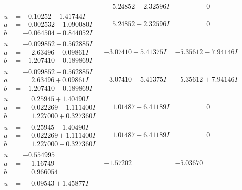 \documentclass[1p]{elsarticle_modified}
\theoremstyle{definition}
\begin{document}
$$\begin{array}{c|c|c}
 & \phantom{-}5.24852 + 2.32596 I & \phantom{-0.000000 } 0 \\ \hline\begin{aligned}
u &= -0.10252 - 1.41744 I \\
a &= -0.002532 + 1.090080 I \\
b &= -0.064504 - 0.844052 I\end{aligned}
 & \phantom{-}5.24852 - 2.32596 I & \phantom{-0.000000 } 0 \\ \hline\begin{aligned}
u &= -0.099852 + 0.562885 I \\
a &= \phantom{-}2.63496 - 0.09861 I \\
b &= -1.207410 + 0.189869 I\end{aligned}
 & -3.07410 + 5.41375 I & -5.35612 - 7.94146 I \\ \hline\begin{aligned}
u &= -0.099852 - 0.562885 I \\
a &= \phantom{-}2.63496 + 0.09861 I \\
b &= -1.207410 - 0.189869 I\end{aligned}
 & -3.07410 - 5.41375 I & -5.35612 + 7.94146 I \\ \hline\begin{aligned}
u &= \phantom{-}0.25945 + 1.40490 I \\
a &= \phantom{-}0.022269 - 1.111400 I \\
b &= \phantom{-}1.227000 + 0.327360 I\end{aligned}
 & \phantom{-}1.01487 - 6.41189 I & \phantom{-0.000000 } 0 \\ \hline\begin{aligned}
u &= \phantom{-}0.25945 - 1.40490 I \\
a &= \phantom{-}0.022269 + 1.111400 I \\
b &= \phantom{-}1.227000 - 0.327360 I\end{aligned}
 & \phantom{-}1.01487 + 6.41189 I & \phantom{-0.000000 } 0 \\ \hline\begin{aligned}
u &= -0.554995\phantom{ +0.000000I} \\
a &= \phantom{-}1.16749\phantom{ +0.000000I} \\
b &= \phantom{-}0.966054\phantom{ +0.000000I}\end{aligned}
 & -1.57202\phantom{ +0.000000I} & -6.03670\phantom{ +0.000000I} \\ \hline\begin{aligned}
u &= \phantom{-}0.09543 + 1.45877 I \\

\end{aligned}
\end{array}$$
\end{document}

